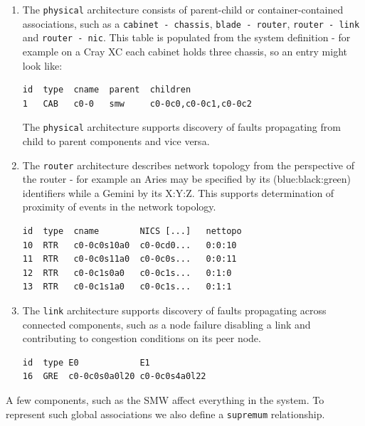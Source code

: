 \begin{enumerate}
\item The \texttt{physical} architecture consists of parent-child or
container-contained associations, such as a \texttt{cabinet - chassis}, 
\texttt{blade - router}, \texttt{router - link} and \texttt{router - nic}.
This table is populated from the system definition - for example on a 
Cray XC each cabinet holds three chassis, so an entry might look like:

\begin{small}
\begin{verbatim}
id  type  cname  parent  children
1   CAB   c0-0   smw     c0-0c0,c0-0c1,c0-0c2
\end{verbatim}
\end{small}

The \texttt{physical} architecture supports discovery of faults 
propagating from child to parent components and vice versa.

\item The \texttt{router} architecture describes network topology
from the perspective of the router - for example an Aries may be specified by its 
(blue:black:green) identifiers  while a Gemini by its X:Y:Z. This 
supports determination of proximity of events in the network topology.

\begin{small}
\begin{verbatim}
id  type  cname        NICS [...]   nettopo
10  RTR   c0-0c0s10a0  c0-0cd0...   0:0:10
11  RTR   c0-0c0s11a0  c0-0c0s...   0:0:11
12  RTR   c0-0c1s0a0   c0-0c1s...   0:1:0
13  RTR   c0-0c1s1a0   c0-0c1s...   0:1:1
\end{verbatim}
\end{small}

\item The \texttt{link} architecture supports 
discovery of faults propagating across connected components,
such as a node failure disabling a link and contributing to 
congestion conditions on its peer node.

\begin{small}
\begin{verbatim}
id  type E0            E1            
16  GRE  c0-0c0s0a0l20 c0-0c0s4a0l22 
\end{verbatim}
\end{small}

\end{enumerate}

A few components, such as the SMW affect everything in the system. To represent 
such global associations we also define
a \texttt{supremum} relationship.




